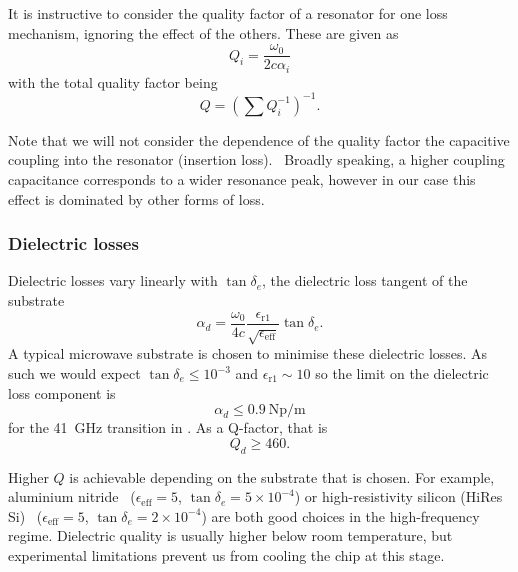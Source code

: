 It is instructive to consider the quality factor of a resonator for one loss
mechanism, ignoring the effect of the others. These are given
as~\cite{Simons2004}
\begin{equation}
  Q_i = \frac{\omega_0}{2c\alpha_i}
\end{equation}
with the total quality factor being
\begin{equation}
  Q = \left(\sum Q_i^{-1} \right)^{-1}.
\end{equation}

Note that we will not consider the dependence of the quality factor the
capacitive coupling into the resonator (insertion loss).~\cite{Simons2004,
doi:10.1063/1.3010859} Broadly speaking, a higher coupling capacitance
corresponds to a wider resonance peak, however in our case this effect is
dominated by other forms of loss.


\subsubsection*{Dielectric losses}

Dielectric losses vary linearly with $\tan \delta_e$, the dielectric loss
tangent of the substrate~\cite{Collin2007}
\begin{equation}
  \alpha_d =
  \frac{\omega_0}{4c}\frac{\epsilon_\mathrm{r1}}{\sqrt{\epsilon_\mathrm{eff}}}
  \tan \delta_e.
\end{equation}
A typical microwave substrate is chosen to minimise these dielectric losses. As
such we would expect $\tan\delta_e\leq10^{-3}$ and
$\epsilon_\mathrm{r1} \sim 10$ so the limit on the dielectric loss component is
\begin{equation}
  \alpha_d \leq \SI{0.9}{\neper\per\meter}
\end{equation}
for the \SI{41}{\giga\hertz} transition in \CaF{}. As a Q-factor, that is
\begin{equation}
  Q_d \geq 460.
\end{equation}

Higher $Q$ is achievable depending on the substrate that is chosen. For example,
aluminium nitride~\cite{mw101}  ($\epsilon_\mathrm{eff}=5$, $\tan\delta_e =
5\times10^{-4}$) or high-resistivity silicon (HiRes Si)~\cite{1717770}
($\epsilon_\mathrm{eff}=5$, $\tan\delta_e =2\times10^{-4}$) are both good
choices in the high-frequency regime.  Dielectric quality is usually higher
below room temperature, but experimental limitations prevent us from cooling the
chip at this stage.

